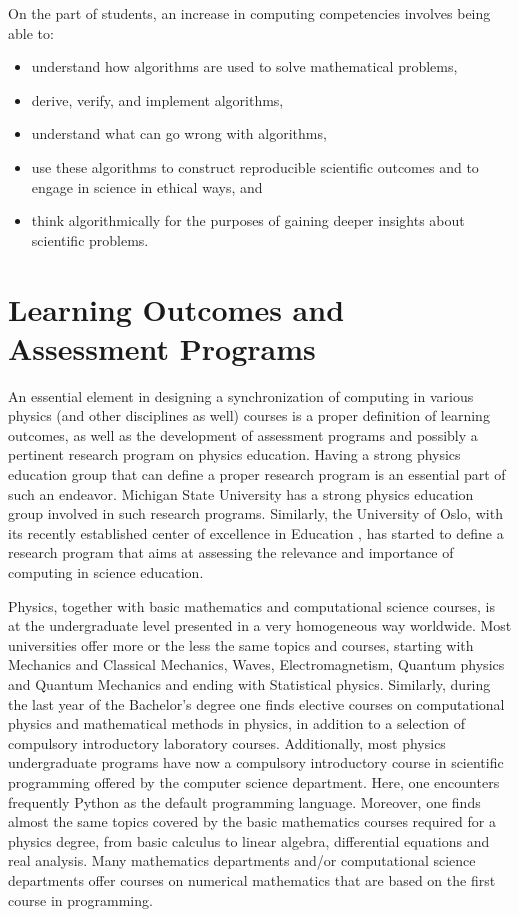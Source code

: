 \documentclass[graybox,envcountchap,sectrefs]{svmult}
\begin{document}
On the part of students, an increase in computing competencies involves being able to:
\begin{itemize}
\item understand how algorithms are used to solve mathematical problems,

\item derive, verify, and implement algorithms,

\item understand what can go wrong with algorithms,

\item use these algorithms to construct reproducible scientific outcomes and to engage in science in ethical ways, and

\item think algorithmically for the purposes of gaining deeper insights about scientific problems.
\end{itemize}


\section{Learning Outcomes and Assessment Programs}\label{sec:learingoutcomes}

An essential element in designing a synchronization of computing in
various physics (and other disciplines as well) courses is a proper
definition of learning outcomes, as well as the development of
assessment programs and possibly a pertinent research program on physics education.
Having a strong physics education
group that can define a proper research program is an essential part
of such an endeavor. Michigan State University has a strong physics
education group involved in such research programs. Similarly, the
University of Oslo, with its recently established center of excellence
in Education \cite{CCSEUiO}, has started to define  a research program that aims at assessing
the relevance and importance of
computing in science education.

Physics, together with basic mathematics and computational science
courses, is at the undergraduate level presented in a very homogeneous
way worldwide.  Most universities offer more or the less the same
topics and courses, starting with Mechanics and Classical Mechanics,
Waves, Electromagnetism, Quantum physics and Quantum Mechanics and
ending with Statistical physics. Similarly, during the last year of
the Bachelor's degree one finds elective courses on computational
physics and mathematical methods in physics, in addition to a
selection of compulsory introductory laboratory courses. Additionally, most physics undergraduate programs have now a compulsory
introductory course in scientific programming offered by the computer science department. Here, one encounters
frequently Python as the default programming language.  Moreover, one
finds almost the same topics covered by the basic mathematics courses
required for a physics degree, from basic calculus to linear algebra,
differential equations and real analysis. Many mathematics departments
and/or computational science departments offer courses on numerical
mathematics that are based on the first course in programming.
\end{document}
